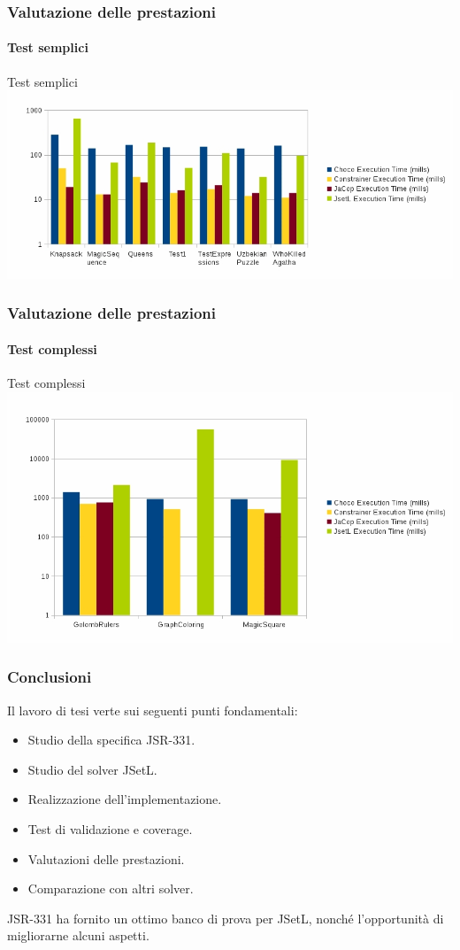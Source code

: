 \documentclass{beamer}
\begin{document}
\begin{frame}
\frametitle{Valutazione delle prestazioni}
\framesubtitle{Test semplici}
\begin{block}{Test semplici}
\includegraphics[scale=.4]{../relazione/img/grafico11.jpg}
\end{block}
\end{frame}

\begin{frame}
\frametitle{Valutazione delle prestazioni}
\framesubtitle{Test complessi}
\begin{block}{Test complessi}
\includegraphics[scale=.35]{../relazione/img/grafico13.jpg}
\end{block}
\end{frame}

\begin{frame}
\frametitle{Conclusioni}
Il lavoro di tesi verte sui seguenti punti fondamentali:
\pause
\begin{itemize}%
\item Studio della specifica JSR-331.
\item Studio del solver JSetL.
\item Realizzazione dell'implementazione.
\item Test di validazione e coverage.
\item Valutazioni delle prestazioni.
\item Comparazione con altri solver.
\end{itemize}

\begin{flushleft}
JSR-331 ha fornito un ottimo banco di prova per JSetL, nonché l'opportunità
di migliorarne alcuni aspetti.
\end{flushleft}
\end{frame}
\end{document}
